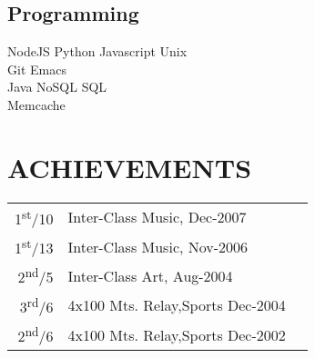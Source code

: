 \documentclass[hidelinks]{deedy-resume-openfont}
\renewcommand{\sectionsep}[0]{\vspace{8pt}}
\begin{document}
\begin{minipage}[t]{0.33\textwidth}
\subsection{Programming}
NodeJS \textbullet{} Python \textbullet{} Javascript \textbullet{} Unix \\
\textbullet{} Git \textbullet{} Emacs \\
Java \textbullet{} NoSQL \textbullet{} SQL \\
 Memcache 
\sectionsep


\section{ACHIEVEMENTS}
\begin{tabular}{rll}
1\textsuperscript{st}/10 & Inter-Class Music, Dec-2007\\
1\textsuperscript{st}/13 & Inter-Class Music, Nov-2006\\
2\textsuperscript{nd}/5 & Inter-Class Art, Aug-2004\\
3\textsuperscript{rd}/6 & 4x100 Mts. Relay,Sports Dec-2004 \\
2\textsuperscript{nd}/6 & 4x100 Mts. Relay,Sports Dec-2002
\end{tabular}
\sectionsep






%

\end{minipage}
\hfill
\end{document}
